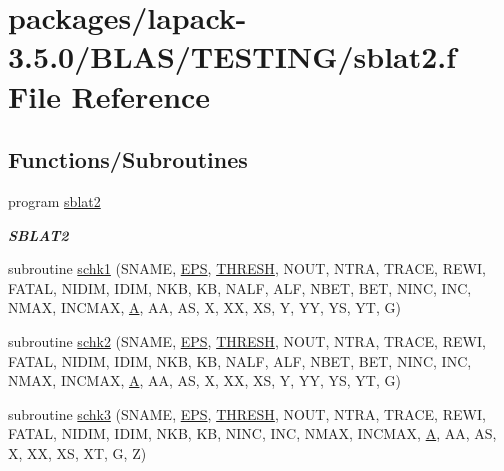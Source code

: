 \hypertarget{sblat2_8f}{}\section{packages/lapack-\/3.5.0/\+B\+L\+A\+S/\+T\+E\+S\+T\+I\+N\+G/sblat2.f File Reference}
\label{sblat2_8f}
\subsection*{Functions/\+Subroutines}
\begin{DoxyCompactItemize}
\item 
program \hyperlink{group__single__blas__testing_ga69200e45d128ffb1e3014de8845f3933}{sblat2}
\begin{DoxyCompactList}\small\item\em {\bfseries S\+B\+L\+A\+T2} \end{DoxyCompactList}\item 
subroutine \hyperlink{sblat2_8f_a72963c988f0815b2696fd1b0e4acf880}{schk1} (S\+N\+A\+M\+E, \hyperlink{tukey_8c_a6ebf6899d6c1c8b7b9d09be872c05aae}{E\+P\+S}, \hyperlink{zlaqgs_8c_a0656018abfc9fa2821827415f5d5ea57}{T\+H\+R\+E\+S\+H}, N\+O\+U\+T, N\+T\+R\+A, T\+R\+A\+C\+E, R\+E\+W\+I, F\+A\+T\+A\+L, N\+I\+D\+I\+M, I\+D\+I\+M, N\+K\+B, K\+B, N\+A\+L\+F, A\+L\+F, N\+B\+E\+T, B\+E\+T, N\+I\+N\+C, I\+N\+C, N\+M\+A\+X, I\+N\+C\+M\+A\+X, \hyperlink{classA}{A}, A\+A, A\+S, X, X\+X, X\+S, Y, Y\+Y, Y\+S, Y\+T, G)
\item 
subroutine \hyperlink{sblat2_8f_af487c92bebaacfb6bd68589513c37b1a}{schk2} (S\+N\+A\+M\+E, \hyperlink{tukey_8c_a6ebf6899d6c1c8b7b9d09be872c05aae}{E\+P\+S}, \hyperlink{zlaqgs_8c_a0656018abfc9fa2821827415f5d5ea57}{T\+H\+R\+E\+S\+H}, N\+O\+U\+T, N\+T\+R\+A, T\+R\+A\+C\+E, R\+E\+W\+I, F\+A\+T\+A\+L, N\+I\+D\+I\+M, I\+D\+I\+M, N\+K\+B, K\+B, N\+A\+L\+F, A\+L\+F, N\+B\+E\+T, B\+E\+T, N\+I\+N\+C, I\+N\+C, N\+M\+A\+X, I\+N\+C\+M\+A\+X, \hyperlink{classA}{A}, A\+A, A\+S, X, X\+X, X\+S, Y, Y\+Y, Y\+S, Y\+T, G)
\item 
subroutine \hyperlink{sblat2_8f_a6d51cc50b2f3e06e07ab721e1d8ba7e1}{schk3} (S\+N\+A\+M\+E, \hyperlink{tukey_8c_a6ebf6899d6c1c8b7b9d09be872c05aae}{E\+P\+S}, \hyperlink{zlaqgs_8c_a0656018abfc9fa2821827415f5d5ea57}{T\+H\+R\+E\+S\+H}, N\+O\+U\+T, N\+T\+R\+A, T\+R\+A\+C\+E, R\+E\+W\+I, F\+A\+T\+A\+L, N\+I\+D\+I\+M, I\+D\+I\+M, N\+K\+B, K\+B, N\+I\+N\+C, I\+N\+C, N\+M\+A\+X, I\+N\+C\+M\+A\+X, \hyperlink{classA}{A}, A\+A, A\+S, X, X\+X, X\+S, X\+T, G, Z)

\end{DoxyCompactItemize}
